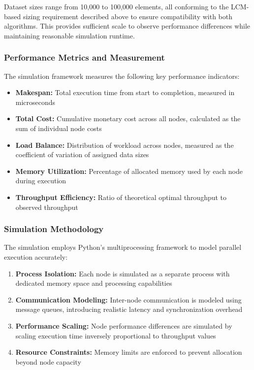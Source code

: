\documentclass[]{interact}
\theoremstyle{plain}
\theoremstyle{definition}
\theoremstyle{remark}
\begin{document}
Dataset sizes range from 10,000 to 100,000 elements, all conforming to the LCM-based sizing requirement described above to ensure compatibility with both algorithms. This provides sufficient scale to observe performance differences while maintaining reasonable simulation runtime.

\subsubsection{Performance Metrics and Measurement}

The simulation framework measures the following key performance indicators:

\begin{itemize}
\item \textbf{Makespan:} Total execution time from start to completion, measured in microseconds
\item \textbf{Total Cost:} Cumulative monetary cost across all nodes, calculated as the sum of individual node costs
\item \textbf{Load Balance:} Distribution of workload across nodes, measured as the coefficient of variation of assigned data sizes
\item \textbf{Memory Utilization:} Percentage of allocated memory used by each node during execution
\item \textbf{Throughput Efficiency:} Ratio of theoretical optimal throughput to observed throughput
\end{itemize}

\subsubsection{Simulation Methodology}

The simulation employs Python's multiprocessing framework to model parallel execution accurately:

\begin{enumerate}
\item \textbf{Process Isolation:} Each node is simulated as a separate process with dedicated memory space and processing capabilities
\item \textbf{Communication Modeling:} Inter-node communication is modeled using message queues, introducing realistic latency and synchronization overhead
\item \textbf{Performance Scaling:} Node performance differences are simulated by scaling execution time inversely proportional to throughput values
\item \textbf{Resource Constraints:} Memory limits are enforced to prevent allocation beyond node capacity
\end{enumerate}
\end{document}
